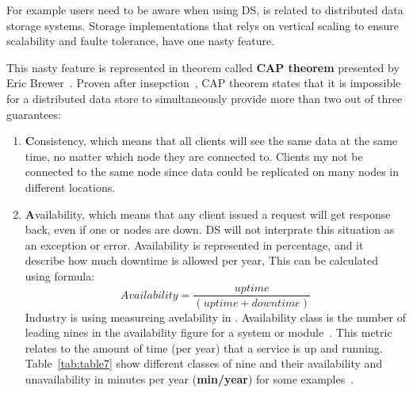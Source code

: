 For example users need to be aware when using DS, is related to distributed data storage systems. Storage implementations that relys on vertical scaling to ensure scalability and faulte tolerance, have one nasty feature. 

This nasty feature is represented in theorem called \textbf{CAP theorem} presented by Eric Brewer~\cite{Brewer2000}. Proven after insepction~\cite{GilbertL02}, CAP theorem states that it is impossible for a distributed data store to simultaneously provide more than two out of three guarantees:

\begin{enumerate} [start=1,label={(\bfseries \arabic*)}]
	\item \textbf{C}onsistency, which means that all clients will see the same data at the same time, no matter which node they are connected to. Clients my not be connected to the same node since data could be replicated on many nodes in different locations.
	\item \textbf{A}vailability, which means that any client issued a request will get response back, even if one or nodes are down. DS will not interprate this situation as an exception or error. Availability is represented in percentage, and it describe how much downtime is allowed per year, This can be calculated using formula:\\ 
	
	\begin{equation}\label{eq:Availability}
		Availability = \frac{uptime}{ (uptime + downtime)}
	\end{equation}
	Industry is using measureing avelability in . Availability class is the number of leading nines in the availability figure for a system or module~\cite{GrayS91}. This metric relates to the amount of time (per year) that a service is up and running. Table~\ref{tab:table7} show different classes of nine and their availability and unavailability in minutes per year (\textbf{min/year}) for some examples~\cite{GrayS91}.
	

\end{enumerate}
